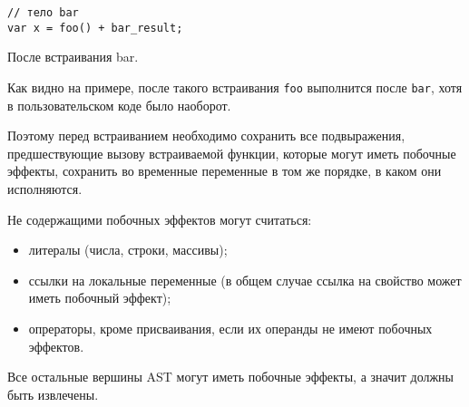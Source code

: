 \begin{listing}[H]
\begin{verbatim}
// тело bar
var x = foo() + bar_result;
\end{verbatim}
\caption{После встраивания bar.}
\end{listing}

Как видно на примере, после такого встраивания
\texttt{foo} выполнится после \texttt{bar}, хотя
в пользовательском коде было наоборот.

Поэтому перед встраиванием необходимо сохранить
все подвыражения, предшествующие вызову
встраиваемой функции, которые могут иметь побочные эффекты,
сохранить во временные переменные в том же порядке,
в каком они исполняются.

Не содержащими побочных эффектов могут считаться:
\begin{itemize}
  \item литералы (числа, строки, массивы);
  \item ссылки на локальные переменные (в общем случае ссылка на свойство
  может иметь побочный эффект);
  \item опрераторы, кроме присваивания, если
  их операнды не имеют побочных эффектов.
\end{itemize}

Все остальные вершины AST могут иметь побочные эффекты,
а значит должны быть извлечены.

